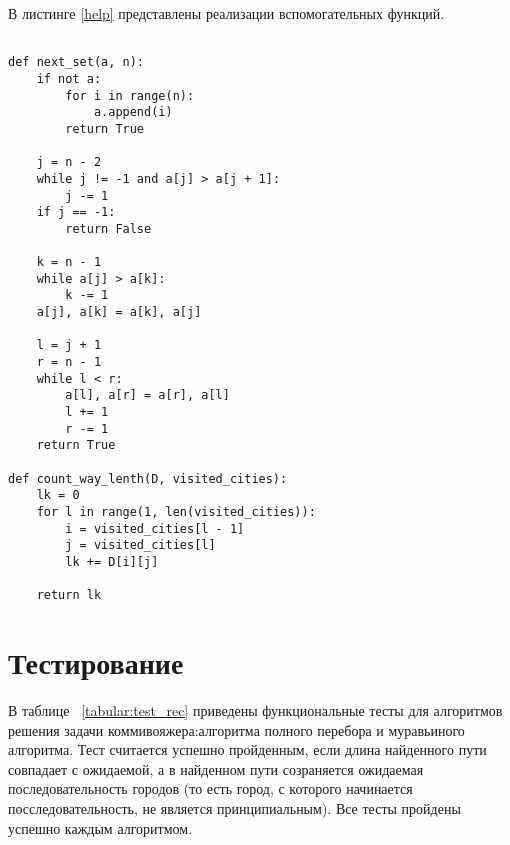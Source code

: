 \clearpage
В листинге \ref{help} представлены реализации вспомогательных функций.


\begin{lstlisting}[caption=Вспомогательные функции,
	label={help}]

def next_set(a, n):
	if not a:
		for i in range(n):
			a.append(i)
		return True
	
	j = n - 2
	while j != -1 and a[j] > a[j + 1]:
		j -= 1
	if j == -1:
		return False  
	
	k = n - 1
	while a[j] > a[k]:
		k -= 1
	a[j], a[k] = a[k], a[j]
	
	l = j + 1
	r = n - 1
	while l < r:
		a[l], a[r] = a[r], a[l]
		l += 1
		r -= 1
	return True

def count_way_lenth(D, visited_cities):
	lk = 0
	for l in range(1, len(visited_cities)):
		i = visited_cities[l - 1]
		j = visited_cities[l]
		lk += D[i][j]
	
	return lk
\end{lstlisting}


\clearpage
\section{Тестирование}

В таблице ~\ref{tabular:test_rec} приведены функциональные тесты для алгоритмов решения задачи коммивояжера:алгоритма полного перебора и муравьиного алгоритма. Тест считается успешно пройденным, если длина найденного пути совпадает с ожидаемой, а в найденном пути созраняется ожидаемая последовательность городов (то есть город, с которого начинается посследовательность, не является принципиальным). Все тесты пройдены успешно каждым алгоритмом.

